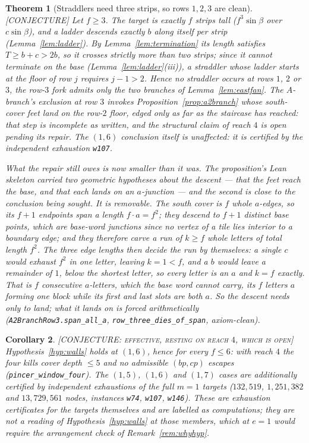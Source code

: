 \documentclass[11pt,reqno]{amsart}
\theoremstyle{plain}
\newtheorem{theorem}{Theorem}
\newtheorem{corollary}[theorem]{Corollary}
\theoremstyle{definition}
\newcommand{\lab}[1]{\hfill\textnormal{\footnotesize\textsc{[#1]}}}
\begin{document}
\begin{theorem}[Straddlers need three strips, so rows $1,2,3$ are clean]\label{thm:strippbound}\lab{CONJECTURE}
Let $f\ge3$. The target is exactly $f$ strips tall ($f^3\sin\beta$ over $c\sin\beta$), and a
ladder descends exactly $b$ along itself per strip (Lemma~\ref{lem:ladder}). By
Lemma~\ref{lem:termination} its length satisfies $T\ge b+c>2b$, so it crosses strictly more than
two strips; since it cannot terminate on the base (Lemma~\ref{lem:ladder}(iii)), a straddler whose
ladder starts at the floor of row $j$ requires $j-1>2$. Hence no straddler occurs at rows $1$,
$2$ or $3$, the row-$3$ fork admits only the two branches of Lemma~\ref{lem:eastfan}. The
$A$-branch's exclusion at row $3$ invokes Proposition~\ref{prop:a2branch} whose south-cover feet
land on the row-$2$ floor, edged only as far as the staircase has reached: that step is
incomplete as written, and the structural claim of reach $4$ is open pending its repair. The
$(1,6)$ conclusion itself is unaffected: it is certified by the independent exhaustion
\texttt{w107}.

What the repair still owes is now smaller than it was. The proposition's Lean skeleton carried two
geometric hypotheses about the descent --- that the feet reach the base, and that each lands on an
$a$-junction --- and the second is close to the conclusion being sought. It is removable. The south
cover is $f$ whole $a$-edges, so its $f+1$ endpoints span a length $f\cdot a=f^2$; they descend to
$f+1$ distinct base points, which are base-word junctions since no vertex of a tile lies interior to
a boundary edge; and they therefore carve a run of $k\ge f$ whole letters of total length $f^2$.
The three edge lengths then decide the run by themselves: a single $c$ would exhaust $f^2$ in one
letter, leaving $k=1<f$, and a $b$ would leave a remainder of $1$, below the shortest letter, so
every letter is an $a$ and $k=f$ exactly. That is $f$ consecutive $a$-letters, which the base word
cannot carry, its $f$ letters $a$ forming one block while its first and last slots are both $a$.
So the descent needs only to \emph{land}; what it lands on is forced arithmetically
(\texttt{A2BranchRow3.span\_all\_a}, \texttt{row\_three\_dies\_of\_span}, axiom-clean).
\end{theorem}

\begin{corollary}\label{cor:walls16}\lab{CONJECTURE: effective, resting on reach $4$, which is open}
Hypothesis~\ref{hyp:walls} holds at $(1,6)$, hence for every $f\le6$: with reach $4$ the four
kills cover depth $\le5$ and no admissible $(bp,cp)$ escapes (\texttt{pincer\_window\_four}).
The $(1,5)$, $(1,6)$ and $(1,7)$ cases are additionally certified by independent exhaustions of
the full $m=1$ targets ($132{,}519$, $1{,}251{,}382$ and $13{,}729{,}561$ nodes, instances
\texttt{w74}, \texttt{w107}, \texttt{w146}). These are exhaustion certificates for the targets
themselves and are labelled as computations; they are not a reading of
Hypothesis~\ref{hyp:walls} at those members, which at $e=1$ would require the arrangement check
of Remark~\ref{rem:whyhyp}.
\end{corollary}
\end{document}
